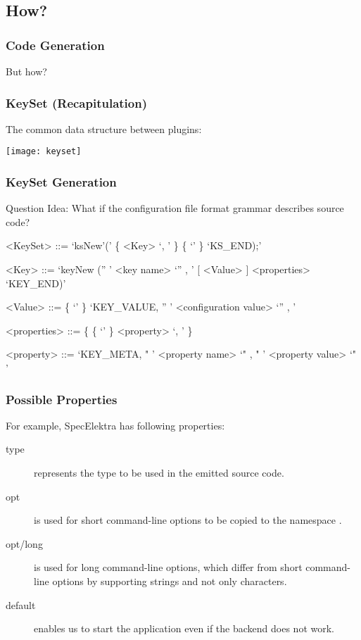 \subsection{How?}

\begin{frame}
	\frametitle{Code Generation}


	\pause
	\vspace{2em}
	But how?
\end{frame}

\begin{frame}
	\frametitle{KeySet (Recapitulation)}

	The common data structure between plugins:
	\vspace{1cm}

	\texttt{[image: keyset]}
\end{frame}

\begin{frame}[fragile]
	\frametitle{KeySet Generation}
	\begin{alertblock}{Question}
	Idea: What if the configuration file format grammar describes source code?
	\end{alertblock}
	\pause

	\begin{grammar}
	<KeySet> ::= \lq ksNew'\WhiteSpace(' \{ <Key> \lq , \LineBreak'  \}  \{ \lq\WhiteSpace' \} \lq KS\_END);'

	<Key> ::= \lq keyNew \WhiteSpace ('' ' <key name> \lq ''  , \LineBreak' [ <Value> ] <properties> \lq KEY_END)'

	<Value> ::=  \{ \lq\WhiteSpace' \} \lq KEY\_VALUE, \WhiteSpace '' ' <configuration value> \lq ''  , \LineBreak'

	<properties> ::= \{ \{ \lq\WhiteSpace' \} <property> \lq , \LineBreak' \}

	<property> ::=  \lq KEY\_META, \WhiteSpace " ' <property name> \lq "  , \WhiteSpace " ' <property value> \lq " '
	\end{grammar}
\end{frame}

\begin{frame}
	\frametitle{Possible Properties}

	For example, SpecElektra has following properties:
	\begin{description}
	\item[type] represents the type to be used in the emitted source code.
	\item[opt] is used for short command-line options to be copied to the namespace .
	\item[opt/long] is used for long command-line options, which differ from short command-line options by supporting strings and not only characters.
	\item[default] enables us to start the application even if the backend does not work.
	\end{description}
\end{frame}

